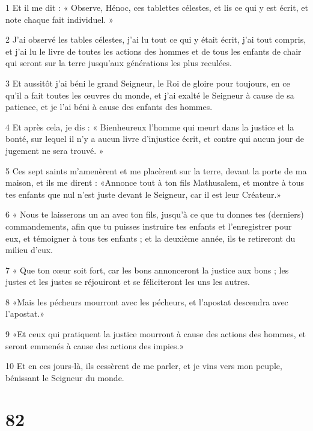\par 1 Et il me dit : « Observe, Hénoc, ces tablettes célestes, et lis ce qui y est écrit, et note chaque fait individuel. »
\par 2 J'ai observé les tables célestes, j'ai lu tout ce qui y était écrit, j'ai tout compris, et j'ai lu le livre de toutes les actions des hommes et de tous les enfants de chair qui seront sur la terre jusqu'aux générations les plus reculées.
\par 3 Et aussitôt j'ai béni le grand Seigneur, le Roi de gloire pour toujours, en ce qu'il a fait toutes les œuvres du monde, et j'ai exalté le Seigneur à cause de sa patience, et je l'ai béni à cause des enfants des hommes.
\par 4 Et après cela, je dis : « Bienheureux l'homme qui meurt dans la justice et la bonté, sur lequel il n'y a aucun livre d'injustice écrit, et contre qui aucun jour de jugement ne sera trouvé. »
\par 5 Ces sept saints m'amenèrent et me placèrent sur la terre, devant la porte de ma maison, et ils me dirent : «Annonce tout à ton fils Mathusalem, et montre à tous tes enfants que nul n'est juste devant le Seigneur, car il est leur Créateur.»
\par 6 « Nous te laisserons un an avec ton fils, jusqu'à ce que tu donnes tes (derniers) commandements, afin que tu puisses instruire tes enfants et l'enregistrer pour eux, et témoigner à tous tes enfants ; et la deuxième année, ils te retireront du milieu d’eux.
\par 7 « Que ton cœur soit fort, car les bons annonceront la justice aux bons ; les justes et les justes se réjouiront et se féliciteront les uns les autres.
\par 8 «Mais les pécheurs mourront avec les pécheurs, et l'apostat descendra avec l'apostat.»
\par 9 «Et ceux qui pratiquent la justice mourront à cause des actions des hommes, et seront emmenés à cause des actions des impies.»
\par 10 Et en ces jours-là, ils cessèrent de me parler, et je vins vers mon peuple, bénissant le Seigneur du monde.

\chapter{82}

